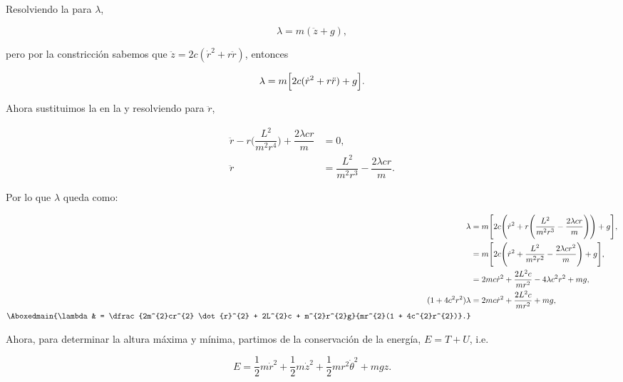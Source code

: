 \documentclass[../main.tex]{subfiles}
\begin{document}
\begin{problema}
	Resolviendo la  para \(\lambda\),

	\begin{equation*}
		\lambda = m(\ddot{z} + g),
	\end{equation*}

	pero por la constricción sabemos que \(\ddot{z} = 2c(\dot{r}^{2} + r \ddot{r})\),
	entonces

	\begin{equation}
		\lambda = m \Bigl[2c(\dot{r}^{2} + r \ddot{r}) + g\Bigr].
		\label{eq:lagrange-multiplier}
	\end{equation}

	Ahora sustituimos la  en
	la  y resolviendo para \(\ddot{r}\),

	\begin{align*}
		\ddot{r} - r \Biggl(\dfrac{L^{2}}{m^{2}r^{4}}\Biggr) + \dfrac{2\lambda cr}{m} & = 0,                                                  \\
		\ddot{r}                                                                      & = \dfrac{L^{2}}{m^{2}r^{3}} - \dfrac{2\lambda cr}{m}.
	\end{align*}

	Por lo que \(\lambda\) queda como:

	\begin{align*}
		\lambda                  & = m \Biggl[2c \Biggl(\dot{r}^{2} + r \Biggl(\dfrac{L^{2}}{m^{2}r^{3}} - \dfrac{2\lambda cr}{m}\Biggr)\Biggr) + g\Biggr], \\
		                         & = m \Biggl[2c \Biggl(\dot{r}^{2} + \dfrac{L^{2}}{m^{2}r^{2}} - \dfrac{2\lambda cr^{2}}{m}\Biggr) + g\Biggr],             \\
		                         & = 2mc \dot{r}^{2} + \dfrac{2L^{2}c}{mr^{2}} - 4\lambda c^{2}r^{2} + mg,                                                  \\
		(1 + 4c^{2}r^{2})\lambda & = 2mc \dot{r}^{2} + \dfrac{2L^{2}c}{mr^{2}} + mg,                                                                        \\
		\Aboxedmain{\lambda      & = \dfrac{2m^{2}cr^{2} \dot{r}^{2} + 2L^{2}c + m^{2}r^{2}g}{mr^{2}(1 + 4c^{2}r^{2})}.}
	\end{align*}

	Ahora, para determinar la altura máxima y mínima, partimos de la conservación
	de la energía, \(E = T + U\), i.e.

	\begin{equation*}
		E = \dfrac{1}{2}m \dot{r}^{2} + \dfrac{1}{2}m \dot{z}^{2} + \dfrac{1}{2}mr^{2} \dot{\theta}^{2} + mgz.
	\end{equation*}


\end{problema}
\end{document}
